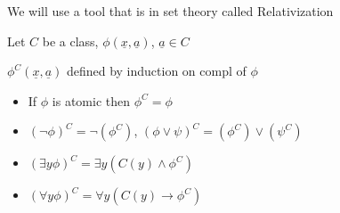 We will use a tool that is in set theory called Relativization

Let $C$ be a class, $\phi(\underline{x},\underline{a})$, $\underline{a}\in C$

$\phi^C(\underline{x},\underline{a})$ defined by induction on compl of $\phi$
\begin{itemize}
    \item If $\phi$ is atomic then $\phi^C = \phi$
    \item $(\lnot \phi)^C = \lnot (\phi^C)$,  $( \phi\lor \psi)^C =  (\phi^C)\lor(\psi^C)$  
    \item $(\exists y \phi)^C = \exists y (C(y)\land \phi^C)$
    \item $(\forall y \phi)^C = \forall y (C(y)\to \phi^C)$
\end{itemize}


